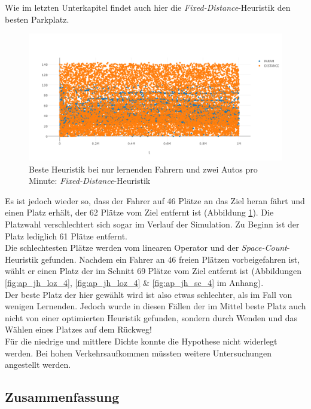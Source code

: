 Wie im letzten Unterkapitel findet auch hier die \emph{Fixed-Distance}-Heuristik den besten Parkplatz.
\begin{figure}
	\includegraphics[width=\textwidth]{analyse/JustHeuristik/4pm/fixed4just.png}
	\caption{Beste Heuristik bei nur lernenden Fahrern und zwei Autos pro Minute: \emph{Fixed-Distance}-Heuristik} \label{fig:res_jh_4pm_best}
\end{figure}
Es ist jedoch wieder so, dass der Fahrer auf 46 Plätze an das Ziel heran fährt und einen Platz erhält, der 62 Plätze vom Ziel entfernt ist (Abbildung \ref{fig:res_jh_4pm_best}). Die Platzwahl verschlechtert sich sogar im Verlauf der Simulation. Zu Beginn ist der Platz lediglich 61 Plätze entfernt.\\
Die schlechtesten Plätze werden vom linearen Operator und der \emph{Space-Count}-Heuristik gefunden. Nachdem ein Fahrer an 46 freien Plätzen vorbeigefahren ist, wählt er einen Platz der im Schnitt 69 Plätze vom Ziel entfernt ist (Abbildungen \ref{fig:ap_jh_loz_4}, \ref{fig:ap_jh_loz_4} \& \ref{fig:ap_jh_sc_4} im Anhang).\\

Der beste Platz der hier gewählt wird ist also etwas schlechter, als im Fall von wenigen Lernenden. Jedoch wurde in diesen Fällen der im Mittel beste Platz auch nicht von einer optimierten Heuristik gefunden, sondern durch Wenden und das Wählen eines Platzes auf dem Rückweg!\\
Für die niedrige und mittlere Dichte konnte die Hypothese nicht widerlegt werden. Bei hohen Verkehrsaufkommen müssten weitere Untersuchungen angestellt werden.

\subsection{Zusammenfassung}

